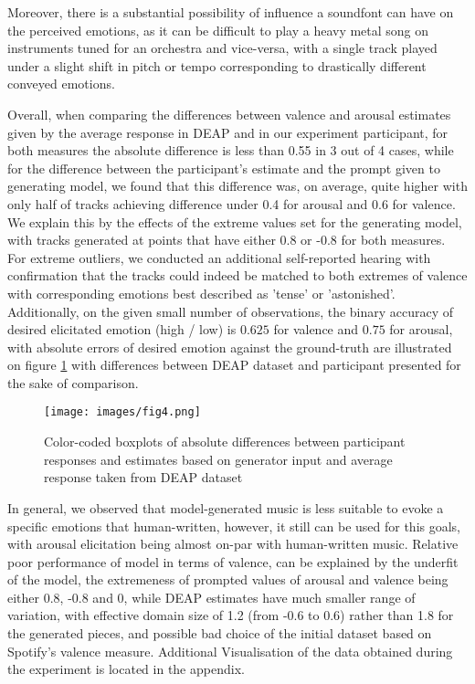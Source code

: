 \documentclass[14pt]{extreport}
\begin{document}
Moreover, there is a substantial possibility of influence a soundfont can have on the perceived emotions, as it can be difficult to play a heavy metal song on instruments tuned for an orchestra and vice-versa, with a single track played under a slight shift in pitch or tempo corresponding to drastically different conveyed emotions.


Overall, when comparing the differences between valence and arousal estimates given by the average response in DEAP and in our experiment participant, for both measures the absolute difference is less than  0.55 in 3 out of 4 cases, while for the difference between the participant's estimate and the prompt given to generating model, we found that this difference was, on average, quite higher with only half of tracks achieving difference under 0.4 for \gls{arousal} and 0.6 for \gls{valence}. We explain this by the effects of the extreme values set for the generating model, with tracks generated at points that have either 0.8 or -0.8 for both measures. For extreme outliers, we conducted an additional self-reported hearing with confirmation that the tracks could indeed be matched to both extremes of valence with corresponding emotions best described as 'tense' or 'astonished'. Additionally, on the given small number of observations, the binary accuracy of desired elicitated emotion (high / low) is $0.625$ for valence and $0.75$ for arousal, with absolute errors of desired emotion against the ground-truth are illustrated on figure \ref{fig:error} with differences between DEAP dataset and participant presented for the sake of comparison.

\begin{figure}[h!]
    \centering
    \texttt{[image: images/fig4.png]}
    \caption{Color-coded boxplots of absolute differences between participant responses and estimates based on generator input and average response taken from DEAP dataset}
    \label{fig:error}
\end{figure}
In general, we observed that model-generated music is less suitable to evoke a specific emotions that human-written, however, it still can be used for this goals, with arousal elicitation being almost on-par with human-written music. Relative poor performance of model in terms of valence, can be explained by the underfit of the model, the extremeness of prompted values of arousal and valence being either 0.8, -0.8 and 0, while DEAP estimates have much smaller range of variation, with effective domain size of 1.2 (from -0.6 to 0.6) rather than 1.8 for the generated pieces, and possible bad choice of the initial dataset based on Spotify's valence measure. Additional Visualisation of the data obtained during the experiment is located in the appendix.
\end{document}
